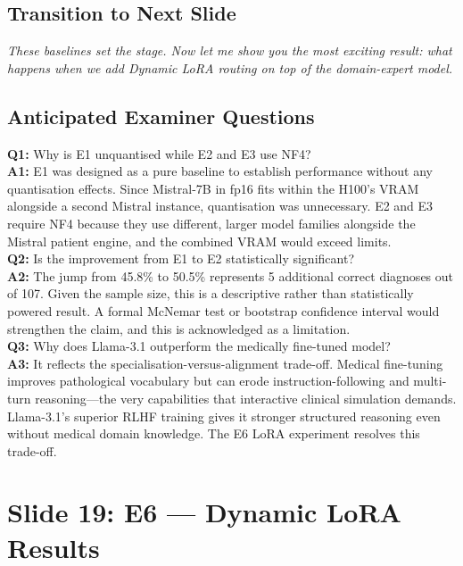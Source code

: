 \documentclass[12pt]{article}
\begin{document}
  \subsection*{Transition to Next Slide}
  {\color{transgreen}
  \textit{These baselines set the stage. Now let me show you the most exciting result: what happens when we add Dynamic LoRA routing on top of the domain-expert model.}
  }

  \subsection*{Anticipated Examiner Questions}
  \begin{qabox}
  \textbf{Q1:} Why is E1 unquantised while E2 and E3 use NF4? \\
  \textbf{A1:} E1 was designed as a pure baseline to establish performance without any quantisation effects. Since Mistral-7B in fp16 fits within the H100's VRAM alongside a second Mistral instance, quantisation was unnecessary. E2 and E3 require NF4 because they use different, larger model families alongside the Mistral patient engine, and the combined VRAM would exceed limits. \\[6pt]
  \textbf{Q2:} Is the improvement from E1 to E2 statistically significant? \\
  \textbf{A2:} The jump from 45.8\% to 50.5\% represents 5 additional correct diagnoses out of 107. Given the sample size, this is a descriptive rather than statistically powered result. A formal McNemar test or bootstrap confidence interval would strengthen the claim, and this is acknowledged as a limitation. \\[6pt]
  \textbf{Q3:} Why does Llama-3.1 outperform the medically fine-tuned model? \\
  \textbf{A3:} It reflects the specialisation-versus-alignment trade-off. Medical fine-tuning improves pathological vocabulary but can erode instruction-following and multi-turn reasoning---the very capabilities that interactive clinical simulation demands. Llama-3.1's superior RLHF training gives it stronger structured reasoning even without medical domain knowledge. The E6 LoRA experiment resolves this trade-off.
  \end{qabox}



  \section{Slide 19: E6 --- Dynamic LoRA Results}
\end{document}
